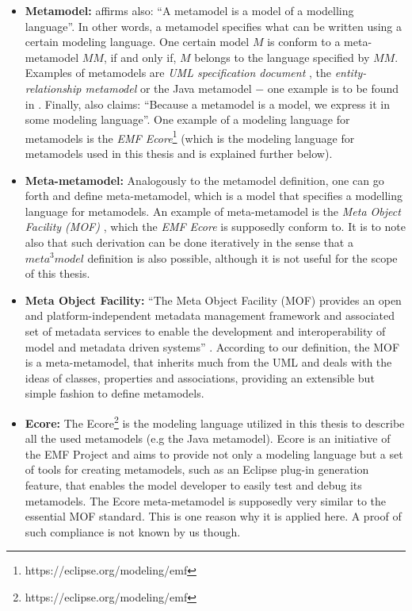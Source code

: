 \documentclass[tuberlin,cic,tc,english,noabntcite, oneside]{iiufrgs}
\begin{document}
\begin{itemize}
	\item \textbf{Metamodel:} \citet[p. 14]{favre2004foundations2} affirms also: \enquote{A metamodel is a model of a modelling language}. In other words, a metamodel specifies what can be written using a certain modeling language. One certain model $M$ is conform to a meta-metamodel $MM$, if and only if, $M$ belongs to the language specified by $MM$. Examples of metamodels are \emph{UML specification document} \citep{omg2007unified}, the \emph{entity-relationship metamodel} \citep{chen1976entity} or the Java metamodel $-$ one example is to be found in \citet{heidenreich2009jamopp}. Finally, \citet[p. 29]{seidewitz2003models} also claims: \enquote{Because a metamodel is a model, we express it in some modeling language}. One example of a modeling language for metamodels is the \emph{EMF Ecore}\footnote{https://eclipse.org/modeling/emf} (which is the modeling language for metamodels used in this thesis and is explained further below).

	\item \textbf{Meta-metamodel:} Analogously to the metamodel definition, one can go forth and define meta-metamodel, which is a model that specifies a modelling language for metamodels. An example of meta-metamodel is the \emph{Meta Object Facility (MOF)} \citep{omg2015meta}, which the \emph{EMF Ecore} is supposedly conform to. It is to note also that such derivation can be done iteratively in the sense that a $meta^3model$ definition is also possible, although it is not useful for the scope of this thesis.
	
	\item \textbf{Meta Object Facility:} \enquote{The Meta Object Facility (MOF) provides an open and platform-independent metadata management framework and associated set of metadata services to enable the development and interoperability of model and metadata driven systems} \citep{omg2015meta}. According to our definition, the MOF is a meta-metamodel, that inherits much from the UML and deals with the ideas of classes, properties and associations, providing an extensible but simple fashion to define metamodels.
	
	\item \textbf{Ecore:} The Ecore\footnote{https://eclipse.org/modeling/emf} is the modeling language utilized in this thesis to describe all the used metamodels (e.g the Java metamodel). Ecore is an initiative of the EMF Project and aims to provide not only a modeling language but a set of tools for creating metamodels, such as an Eclipse plug-in generation feature, that enables the model developer to easily test and debug its metamodels. The Ecore meta-metamodel is supposedly very similar to the essential MOF standard. This is one reason why it is applied here. A proof of such compliance is not known by us though.
\end{itemize}
	
\end{document}
